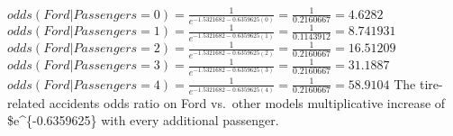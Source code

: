 \documentclass[
]{article}
\begin{document}
\(odds(Ford|Passengers = 0) = \frac{1}{e^{-1.5321682 - 0.6359625(0)}} = \frac{1}{0.2160667} = 4.6282\)
\newline
\(odds(Ford|Passengers = 1) = \frac{1}{e^{-1.5321682 - 0.6359625(1)}} = \frac{1}{0.1143912} = 8.741931\)
\newline
\(odds(Ford|Passengers = 2) = \frac{1}{e^{-1.5321682 - 0.6359625(2)}} = \frac{1}{0.2160667} = 16.51209\)
\newline
\(odds(Ford|Passengers = 3) = \frac{1}{e^{-1.5321682 - 0.6359625(3)}} = \frac{1}{0.2160667} = 31.1887\)
\newline
\(odds(Ford|Passengers = 4) = \frac{1}{e^{-1.5321682 - 0.6359625(4)}} = \frac{1}{0.2160667} = 58.9104\)
\newline \newline The tire-related accidents odds ratio on Ford
vs.~other models multiplicative increase of \$e\^{}\{-0.6359625\} with
every additional passenger.
\end{document}
